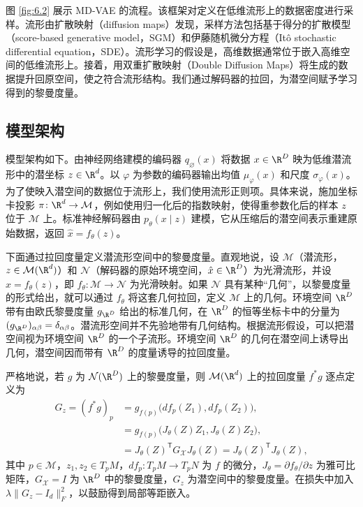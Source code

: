 图 \ref{fig:6.2} 展示 MD-VAE 的流程。该框架对定义在低维流形上的数据密度进行采样。流形由扩散映射（diffusion maps）发现，采样方法包括基于得分的扩散模型（score-based generative model，SGM）和伊藤随机微分方程（Itô stochastic differential equation，SDE）。流形学习的假设是，高维数据通常位于嵌入高维空间的低维流形上。接着，用双重扩散映射（Double Diffusion Maps）将生成的数据提升回原空间，使之符合流形结构。我们通过解码器的拉回，为潜空间赋予学习得到的黎曼度量。

\subsection{模型架构}

模型架构如下。由神经网络建模的编码器 $q_{\varnothing}(x)$ 将数据 $x\in\R^D$ 映为低维潜流形中的潜坐标 $z\in\R^d$。以 $\varphi$ 为参数的编码器输出均值 $\mu_\varphi(x)$ 和尺度 $\sigma_\varphi(x)$。为了使映入潜空间的数据位于流形上，我们使用流形正则项。具体来说，施加坐标卡投影 $\pi\colon\R^d\to\mathcal M$，例如使用归一化后的指数映射，使得重参数化后的样本 $z$ 位于 $\mathcal M$ 上。标准神经解码器由 $p_\theta(x\mid z)$ 建模，它从压缩后的潜空间表示重建原始数据，返回 $\hat x=f_\theta(z)$。

下面通过拉回度量定义潜流形空间中的黎曼度量。直观地说，设 $\mathcal M$（潜流形，$z\in\mathcal M(\R^d)$）和 $\mathcal N$（解码器的原始环境空间，$\hat x\in\R^D$）为光滑流形，并设 $x=f_\theta(z)$，即 $f_\theta\colon\mathcal M\to\mathcal N$ 为光滑映射。如果 $\mathcal N$ 具有某种“几何”，以黎曼度量的形式给出，就可以通过 $f_\theta$ 将这套几何拉回，定义 $\mathcal M$ 上的几何。环境空间 $\R^D$ 带有由欧氏黎曼度量 $g_{\R^D}$ 给出的标准几何，在 $\R^D$ 的恒等坐标卡中的分量为 $(g_{\R^D})_{\alpha\beta}=\delta_{\alpha\beta}$。潜流形空间并不先验地带有几何结构。根据流形假设，可以把潜空间视为环境空间 $\R^D$ 的一个子流形。环境空间 $\R^D$ 的几何在潜空间上诱导出几何，潜空间因而带有 $\R^D$ 的度量诱导的拉回度量。

严格地说，若 $g$ 为 $\mathcal N(\R^D)$ 上的黎曼度量，则 $\mathcal M(\R^d)$ 上的拉回度量 $f^*g$ 逐点定义为
\[
  \begin{aligned}
    G_z=(f^*g)_p
     &=g_{f(p)}\bigl(df_p(Z_1),df_p(Z_2)\bigr),\\
     &=g_{f(p)}\bigl(J_\theta(Z)Z_1,J_\theta(Z)Z_2\bigr),\\
     &=J_\theta(Z)^{\mathsf T}G_{\mathcal X}J_\theta(Z)
       =J_\theta(Z)^{\mathsf T}J_\theta(Z),
  \end{aligned}
\]
其中 $p\in\mathcal M$，$z_1,z_2\in T_pM$，$df_p\colon T_pM\to T_pN$ 为 $f$ 的微分，$J_\theta=\partial f_\theta/\partial z$ 为雅可比矩阵，$G_{\mathcal X}=I$ 为 $\R^D$ 中的黎曼度量，$G_z$ 为潜空间中的黎曼度量。在损失中加入 $\lambda\lVert G_z-I_d\rVert_F^2$，以鼓励得到局部等距嵌入。

